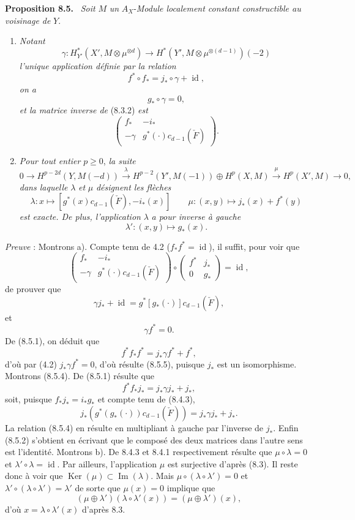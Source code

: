 \documentclass[11pt]{article}
\newenvironment{statement}[1]{\par\medskip\noindent\textbf{#1.}\ }{\par\medskip}
\providecommand{\Ker}{\operatorname{Ker}}
\providecommand{\Ker}{\operatorname{Ker}}
\providecommand{\Ker}{\operatorname{Ker}}
\begin{document}
\begin{statement}{Proposition 8.5}
\emph{Soit} $M$ \emph{un} $A_X$-\emph{Module localement constant constructible au voisinage de} $Y$.
\begin{enumerate}[label=\alph*)]
\item \emph{Notant}
\[
\gamma:H_{Y'}^*(X',M\otimes\mu^{\otimes d})\to
H^*(Y',M\otimes\mu^{\otimes(d-1)})(-2)
\]
\emph{l'unique application définie par la relation}
\[
f^*\circ f_* = j_*\circ\gamma+\operatorname{id},
\tag{8.5.1}
\]
\emph{on a}
\[
g_*\circ\gamma=0,
\tag{8.5.2}
\]
\emph{et la matrice inverse de} (8.3.2) \emph{est}
\[
\begin{pmatrix}
f_*&-i_*\\
-\gamma&g^*(\cdot)c_{d-1}(\check F)
\end{pmatrix}.
\tag{8.5.3}
\]
\item \emph{Pour tout entier} $p\ge0$, \emph{la suite}
\[
0\to H^{p-2d}(Y,M(-d))
\xrightarrow{\lambda}
H^{p-2}(Y',M(-1))\oplus H^p(X,M)
\xrightarrow{\mu}
H^p(X',M)\to0,
\]
\emph{dans laquelle} $\lambda$ \emph{et} $\mu$ \emph{désignent les flèches}
\[
\lambda : x\longmapsto [g^*(x)c_{d-1}(\check F),-i_*(x)]
\qquad
\mu : (x,y)\mapsto j_*(x)+f^*(y)
\]
\emph{est exacte. De plus, l'application} $\lambda$ \emph{a pour inverse à gauche}
\[
\lambda' : (x,y)\longmapsto g_*(x).
\]
\end{enumerate}
\end{statement}

\emph{Preuve} : Montrons a). Compte tenu de 4.2 ($f_*f^*=\operatorname{id}$), il suffit, pour voir que
\[
\begin{pmatrix}
f_*&-i_*\\
-\gamma&g^*(\cdot)c_{d-1}(\check F)
\end{pmatrix}
\circ
\begin{pmatrix}
f^*&j_*\\
0&g_*
\end{pmatrix}
=\operatorname{id},
\]
de prouver que
\[
\gamma j_*+\operatorname{id}=g^*[g_*(\cdot)]c_{d-1}(\check F),
\tag{8.5.4}
\]
et
\[
\gamma f^*=0.
\tag{8.5.5}
\]
De (8.5.1), on déduit que
\[
f^*f_*f^*=j_*\gamma f^*+f^*,
\]
d'où par (4.2) $j_*\gamma f^*=0$, d'où résulte (8.5.5), puisque $j_*$ est un isomorphisme. Montrons (8.5.4). De (8.5.1) résulte que
\[
f^*f_*j_*=j_*\gamma j_*+j_*,
\]
soit, puisque $f_*j_*=i_*g_*$ et compte tenu de (8.4.3),
\[
j_*(g^*(g_*(\cdot))c_{d-1}(\check F))=j_*\gamma j_*+j_*.
\]
La relation (8.5.4) en résulte en multipliant à gauche par l'inverse de $j_*$. Enfin (8.5.2) s'obtient en écrivant que le composé des deux matrices dans l'autre sens est l'identité. Montrons b). De 8.4.3 et 8.4.1 respectivement résulte que $\mu\circ\lambda=0$ et $\lambda'\circ\lambda=\operatorname{id}$. Par ailleurs, l'application $\mu$ est surjective d'après (8.3). Il reste donc à voir que $\Ker(\mu)\subset\operatorname{Im}(\lambda)$. Mais $\mu\circ(\lambda\circ\lambda')=0$ et $\lambda'\circ(\lambda\circ\lambda')=\lambda'$ de sorte que $\mu(x)=0$ implique que
\[
(\mu\oplus\lambda')(\lambda\circ\lambda'(x))=(\mu\oplus\lambda')(x),
\]
d'où $x=\lambda\circ\lambda'(x)$ d'après 8.3.
\end{document}
